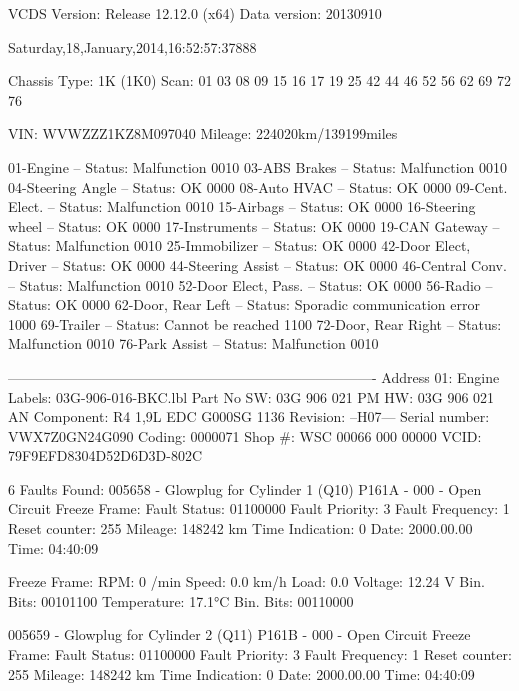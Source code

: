 VCDS Version: Release 12.12.0 (x64)
Data version: 20130910

Saturday,18,January,2014,16:52:57:37888

Chassis Type: 1K (1K0)
Scan: 01 03 08 09 15 16 17 19 25 42 44 46 52 56 62 69 72 76

VIN: WVWZZZ1KZ8M097040   Mileage: 224020km/139199miles

01-Engine -- Status: Malfunction 0010
03-ABS Brakes -- Status: Malfunction 0010
04-Steering Angle -- Status: OK 0000
08-Auto HVAC -- Status: OK 0000
09-Cent. Elect. -- Status: Malfunction 0010
15-Airbags -- Status: OK 0000
16-Steering wheel -- Status: OK 0000
17-Instruments -- Status: OK 0000
19-CAN Gateway -- Status: Malfunction 0010
25-Immobilizer -- Status: OK 0000
42-Door Elect, Driver -- Status: OK 0000
44-Steering Assist -- Status: OK 0000
46-Central Conv. -- Status: Malfunction 0010
52-Door Elect, Pass. -- Status: OK 0000
56-Radio -- Status: OK 0000
62-Door, Rear Left -- Status: Sporadic communication error 1000
69-Trailer -- Status: Cannot be reached 1100
72-Door, Rear Right -- Status: Malfunction 0010
76-Park Assist -- Status: Malfunction 0010
 
-------------------------------------------------------------------------------
Address 01: Engine        Labels: 03G-906-016-BKC.lbl
   Part No SW: 03G 906 021 PM    HW: 03G 906 021 AN
   Component: R4 1,9L EDC G000SG  1136  
   Revision: --H07---    Serial number: VWX7Z0GN24G090
   Coding: 0000071
   Shop #: WSC 00066 000 00000
   VCID: 79F9EFD8304D52D6D3D-802C

6 Faults Found:
005658 - Glowplug for Cylinder 1 (Q10) 
               P161A - 000 - Open Circuit
             Freeze Frame:
                    Fault Status: 01100000
                    Fault Priority: 3
                    Fault Frequency: 1
                    Reset counter: 255
                    Mileage: 148242 km
                    Time Indication: 0
                    Date: 2000.00.00
                    Time: 04:40:09

             Freeze Frame:
                    RPM: 0 /min
                    Speed: 0.0 km/h
                    Load: 0.0 %
                    Voltage: 12.24 V
                    Bin. Bits: 00101100
                    Temperature: 17.1°C
                    Bin. Bits: 00110000

005659 - Glowplug for Cylinder 2 (Q11) 
               P161B - 000 - Open Circuit
             Freeze Frame:
                    Fault Status: 01100000
                    Fault Priority: 3
                    Fault Frequency: 1
                    Reset counter: 255
                    Mileage: 148242 km
                    Time Indication: 0
                    Date: 2000.00.00
                    Time: 04:40:09

